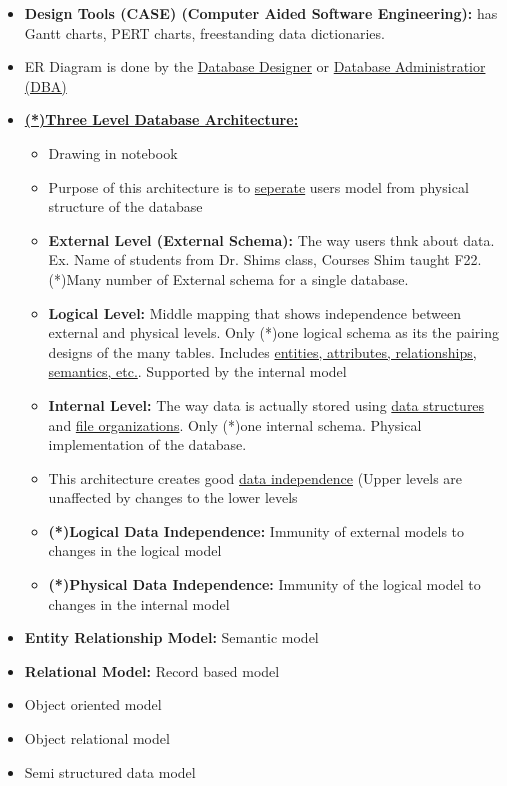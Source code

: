 \documentclass[12pt]{article}
\begin{document}
\begin{itemize}
		  \item \textbf{Design Tools (CASE) (Computer Aided Software Engineering):} has Gantt charts, PERT charts,
					 freestanding data dictionaries.
		  \item ER Diagram is done by the \underline{Database Designer} or 
					 \underline{Database Administratior (DBA)}
		  \item \textbf{\underline{(*)Three Level Database Architecture:}}
					 \begin{itemize}
								\item Drawing in notebook
								\item Purpose of this architecture is to \underline{seperate} users model from physical
										  structure of the database
								\item \textbf{External Level (External Schema):} The way users thnk about data.
										  Ex. Name of students from Dr. Shims class, Courses Shim taught F22. 
										  (*)Many number of External schema for a single database.
								\item \textbf{Logical Level:} Middle mapping that shows independence between
										  external and physical levels. Only (*)one logical schema as its the pairing 
										  designs of the many tables. Includes 
										  \underline{entities, attributes, relationships, semantics, etc.}. Supported
										  by the internal model
								\item \textbf{Internal Level:} The way data is actually stored 
										  using \underline{data structures}
										  and \underline{file organizations}. Only (*)one internal schema. Physical
										  implementation of the database.
								\item This architecture creates good \underline{data independence} (Upper levels
										  are unaffected by changes to the lower levels
								\item \textbf{(*)Logical Data Independence:} Immunity of external models
										  to changes in the logical model
								\item \textbf{(*)Physical Data Independence:} Immunity of the logical model to changes in 
										  the internal model
					 \end{itemize}
		  \item \textbf{Entity Relationship Model:} Semantic model
		  \item \textbf{Relational Model:} Record based model
		  \item Object oriented model
		  \item Object relational model
		  \item Semi structured data model
\end{itemize}
\end{document}
